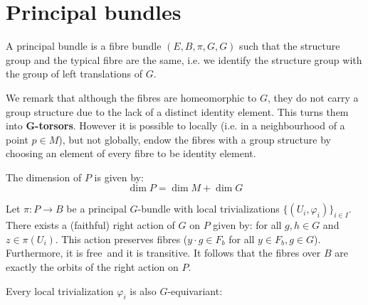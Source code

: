 
\section{Principal bundles}

	\begin{definition}
		A principal bundle is a fibre bundle $(E, B, \pi, G, G)$ such that the structure group and the typical fibre are the same, i.e. we identify the structure group with the group of left translations of $G$.
	\end{definition}	
	\begin{remark}
		We remark that although the fibres are homeomorphic to $G$, they do not carry a group structure due to the lack of a distinct identity element. This turns them into \textbf{G-torsors}. However it is possible to locally (i.e. in a neighbourhood of a point $p\in M$), but not globally, endow the fibres with a group structure by choosing an element of every fibre to be identity element.
	\end{remark}
	
	\begin{property}
		The dimension of $P$ is given by:
		\begin{equation}
			\label{manifolds:principal_bundle_dimension}
			\dim P = \dim M + \dim G
		\end{equation}
	\end{property}

	\begin{property}
		Let $\pi:P\rightarrow B$ be a principal $G$-bundle with local trivializations $\{(U_i, \varphi_i)\}_{i\in I}$. There exists a (faithful) right action of $G$ on $P$ given by:
		for all $g, h\in G$ and $z\in\pi(U_i)$. This action preserves fibres ($y\cdot g\in F_b$ for all $y\in F_b, g\in G$). Furthermore, it is free\footnotemark\ and it is transitive. It follows that the fibres over $B$ are exactly the orbits of the right action on $P$.
		
		 Every local trivialization $\varphi_i$ is also $G$-equivariant:
	\end{property}
	
